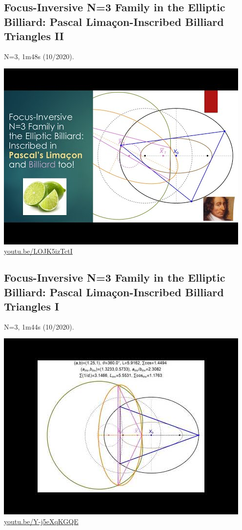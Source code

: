 \documentclass[12pt]{amsart}
\begin{document}
\subsection{Focus-Inversive N=3 Family in the Elliptic Billiard: Pascal Limaçon-Inscribed Billiard Triangles II}
\label{vid:LOJK5izTctI}
\noindent N=3, 1m48s (10/2020). 
\begin{center}\includegraphics[width=.5\textwidth]{pics/LOJK5izTctI.jpg} \\ 
\href{https://youtu.be/LOJK5izTctI}{\url{youtu.be/LOJK5izTctI}}\end{center}
% 
\subsection{Focus-Inversive N=3 Family in the Elliptic Billiard: Pascal Limaçon-Inscribed Billiard Triangles I}
\label{vid:Y-j5eXqKGQE}
\noindent N=3, 1m44s (10/2020). 
\begin{center}\includegraphics[width=.5\textwidth]{pics/Y-j5eXqKGQE.jpg} \\ 
\href{https://youtu.be/Y-j5eXqKGQE}{\url{youtu.be/Y-j5eXqKGQE}}\end{center}
% 
\end{document}
